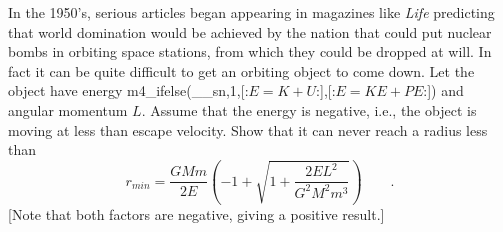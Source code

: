 In the 1950's, serious articles began appearing in
magazines like \emph{Life} predicting that world domination
would be achieved by the nation that could put nuclear bombs
in orbiting space stations, from which they could be dropped
at will. In fact it can be quite difficult to get an
orbiting object to come down. Let the object have energy
m4_ifelse(__sn,1,[:$E=K+U$:],[:$E=KE+PE$:]) and angular momentum $L$. Assume
that the energy is negative, i.e., the object is moving at
less than escape velocity. Show that it can never reach a radius less than
\begin{equation*}
 r_{min}    =     
   \frac{GMm}{2E}\left(-1+\sqrt{1+\frac{2EL^2}{G^2M^2m^3}}\right)
          \qquad   .
\end{equation*}
[Note that both factors are negative, giving a positive result.]
